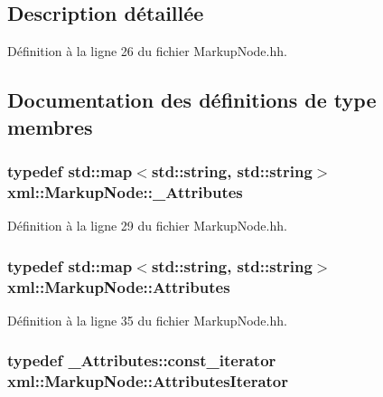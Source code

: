 \subsection{Description détaillée}


Définition à la ligne 26 du fichier MarkupNode.hh.



\subsection{Documentation des définitions de type membres}
\hypertarget{classxml_1_1_markup_node_a2d052c364321c4f1f506f9f17d8c8089}{
\subsubsection[{\_\-Attributes}]{\setlength{\rightskip}{0pt plus 5cm}typedef std::map$<$std::string, std::string$>$ {\bf xml::MarkupNode::\_\-Attributes}}}
\label{classxml_1_1_markup_node_a2d052c364321c4f1f506f9f17d8c8089}


Définition à la ligne 29 du fichier MarkupNode.hh.

\hypertarget{classxml_1_1_markup_node_ade6f6045d18042d1a87f80f308f177fb}{
\subsubsection[{Attributes}]{\setlength{\rightskip}{0pt plus 5cm}typedef std::map$<$std::string, std::string$>$ {\bf xml::MarkupNode::Attributes}}}
\label{classxml_1_1_markup_node_ade6f6045d18042d1a87f80f308f177fb}


Définition à la ligne 35 du fichier MarkupNode.hh.

\hypertarget{classxml_1_1_markup_node_aab83830a10c767edbed9623af05e7a3c}{
\subsubsection[{AttributesIterator}]{\setlength{\rightskip}{0pt plus 5cm}typedef \_\-Attributes::const\_\-iterator {\bf xml::MarkupNode::AttributesIterator}}}
\label{classxml_1_1_markup_node_aab83830a10c767edbed9623af05e7a3c}


